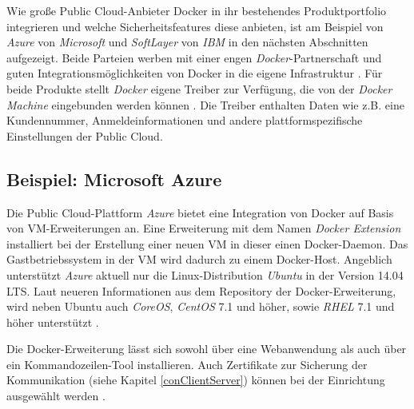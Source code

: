 \documentclass[../main.tex]{subfiles}
\begin{document}
    Wie große Public Cloud-Anbieter Docker in ihr bestehendes Produktportfolio integrieren und welche Sicherheitsfeatures diese anbieten, ist am Beispiel von \emph{Azure} von \emph{Microsoft} und \emph{SoftLayer} von \emph{IBM} in den nächsten Abschnitten aufgezeigt. Beide Parteien werben mit einer engen \emph{Docker}-Partnerschaft und guten Integrationsmöglichkeiten von Docker in die eigene Infrastruktur \cite{dockerPartnershipMicrosoft}\cite{dockerPartnershipIBM}. Für beide Produkte stellt \emph{Docker} eigene Treiber zur Verfügung, die von der \emph{Docker Machine} eingebunden werden können \cite{dockerMachineDriverAzure}\cite{dockerMachineDriverSoftlayer}. Die Treiber enthalten Daten wie z.B. eine Kundennummer, Anmeldeinformationen und andere plattformspezifische Einstellungen der Public Cloud.

    \subsection{Beispiel: Microsoft Azure}
    \label{azure}
      Die Public Cloud-Plattform \emph{Azure} bietet eine Integration von Docker auf Basis von VM-Erweiterungen an. Eine Erweiterung mit dem Namen \emph{Docker Extension} installiert bei der Erstellung einer neuen VM in dieser einen Docker-Daemon. Das Gastbetriebssystem in der VM wird dadurch zu einem Docker-Host. Angeblich unterstützt \emph{Azure} aktuell nur die Linux-Distribution \emph{Ubuntu} in der Version 14.04 \acrshort{LTS}. Laut neueren Informationen aus dem Repository der Docker-Erweiterung, wird neben Ubuntu auch \emph{CoreOS}, \emph{CentOS} 7.1 und höher, sowie \emph{\acrshort{RHEL}} 7.1 und höher unterstützt \cite{githubAzureVMExtension}.


      Die Docker-Erweiterung lässt sich sowohl über eine Webanwendung als auch über ein Kommandozeilen-Tool installieren. Auch Zertifikate zur Sicherung der Kommunikation (siehe Kapitel \ref{conClientServer}) können bei der Einrichtung ausgewählt werden \cite{azureDockerExtension}\cite{azureDockerExtensionCLI}.
\end{document}
